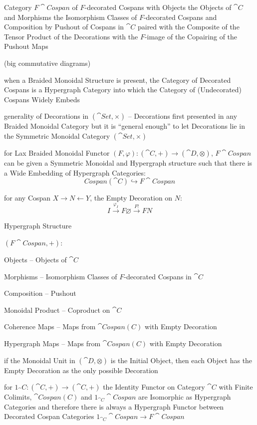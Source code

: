 Category $F\cat{Cospan}$ of $F$-decorated Cospans with Objects the
Objects of $\cat{C}$ and Morphisms the Isomorphism Classes of
$F$-decorated Cospans and Composition by Pushout of Cospans in
$\cat{C}$ paired with the Composite of the Tensor Product of the
Decorations with the $F$-image of the Copairing of the Pushout Maps

(big commutative diagrams) %

when a Braided Monoidal Structure is present, the Category of
Decorated Cospans is a Hypergraph Category into which the Category of
(Undecorated) Cospans Widely Embeds

generality of Decorations in $(\cat{Set}, \times)$ -- Decorations
first presented in any Braided Monoidal Category but it is ``general
enough'' to let Decorations lie in the Symmetric Monoidal Category
$(\cat{Set}, \times)$ %

for Lax Braided Monoidal Functor $(F,\varphi): (\cat{C},+) \rightarrow
(\cat{D},\otimes)$, $F\cat{Cospan}$ can be given a Symmetric Monoidal
and Hypergraph structure such that there is a Wide Embedding of
Hypergraph Categories:
\[
  Cospan(\cat{C}) \hookrightarrow F\cat{Cospan}
\]

for any Cospan $X \rightarrow N \leftarrow Y$, the Empty Decoration on
$N$:
\[
  I \xrightarrow{\varphi_I} F \varnothing \xrightarrow{F!} F N
\]


Hypergraph Structure

$(F\cat{Cospan}, +)$:

Objects -- Objects of $\cat{C}$

Morphisms -- Isomorphism Classes of $F$-decorated Cospans in $\cat{C}$

Composition -- Pushout

Monoidal Product -- Coproduct on $\cat{C}$

Coherence Maps -- Maps from $\cat{Cospan(C)}$ with Empty Decoration

Hypergraph Maps -- Maps from $\cat{Cospan(C)}$ with Empty Decoration


if the Monoidal Unit in $(\cat{D}, \otimes)$ is the Initial Object,
then each Object has the Empty Decoration as the only possible
Decoration

for $1_\cat{C} : (\cat{C}, +) \rightarrow (\cat{C}, +)$ the Identity
Functor on Category $\cat{C}$ with Finite Colimits, $\cat{Cospan(C)}$
and $1_{\cat{C}}\cat{Cospan}$ are Isomorphic as Hypergraph Categories
and therefore there is always a Hypergraph Functor between Decorated
Cospan Categories $1_{\cat{C}}\cat{Cospan} \rightarrow F\cat{Cospan}$


